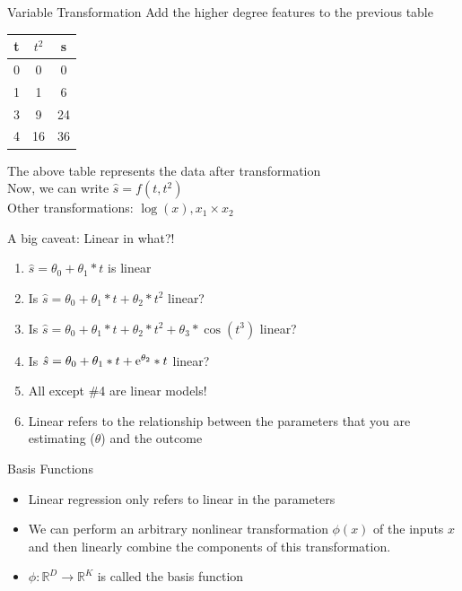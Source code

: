 \documentclass{beamer}
\begin{document}
\begin{frame}{Variable Transformation}
Add the higher degree features to the previous table
    
       
    \begin{center}
 \begin{tabular}{||c c c||} 
 \hline
 t  & $t^{2}$ & s \\ [0.5ex] 
 \hline\hline
 0 & 0&0 \\
 1 & 1&6 \\
 3 & 9&24 \\
 4 & 16&36 \\
 \hline
\end{tabular}
\end{center}

\pause The above table represents the data after transformation \\
\pause Now, we can write $\hat{s}=f(t, t^2)$ \\
\pause Other transformations: $\log(x), x_1\times x_2$
\end{frame}

\begin{frame}{A big caveat: Linear in what?!\footnotemark}
\begin{enumerate}[<+->]
	\item $\hat{s}=\theta_0 + \theta_1*t$
	 is linear
	 \item Is $\hat{s}=\theta_0 + \theta_1*t + \theta_2*t^2$
	 linear?
	 \item Is $\hat{s}=\theta_0 + \theta_1*t + \theta_2*t^2 + \theta_3*\cos(t^3)$
	 linear?
	\item Is $\hat{s}=\theta_0 + \theta_1*t + {\rm e}^{\theta_2}*t$
	linear?
	\item All except \#4 are linear models! 
	\item Linear refers to the relationship between the parameters that you are estimating ($\theta$) and the outcome 
\end{enumerate}
\end{frame}

\begin{frame}{Basis Functions}
    \begin{itemize}
        \item Linear regression only refers to linear in the parameters
        \item We can perform an arbitrary nonlinear transformation $\phi(x)$ of the inputs $x$ and then linearly combine the components of this transformation.
        \item $\phi: \mathbb{R}^D \rightarrow \mathbb{R}^K$ is called the basis function
    \end{itemize} 
    
\end{frame}
\end{document}
